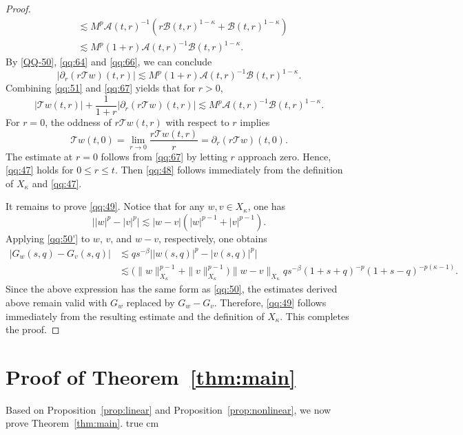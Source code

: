 \documentclass[11pt,twoside]{article}
\newcommand{\Acal}{\mathcal A}
\newcommand{\Bcal}{\mathcal B}
\newcommand{\Tcal}{\mathcal T}
\theoremstyle{plain}
\theoremstyle{definition}
\theoremstyle{remark}
\numberwithin{equation}{section}
\begin{document}
\begin{proof}
\begin{equation}
\begin{aligned}
&\lesssim
M^p\Acal(t,r)^{-1}
\left(
r\Bcal(t,r)^{1-\kappa}
+\Bcal(t,r)^{1-\kappa}
\right)\\
&\lesssim
M^p(1+r)
\Acal(t,r)^{-1}
\Bcal(t,r)^{1-\kappa}.
\end{aligned}
\end{equation}
By \eqref{QQ-50}, \eqref{qq:64} and
\eqref{qq:66}, we can conclude
\begin{equation}
\label{qq:67}
\left|
\partial_r(r\Tcal w)(t,r)
\right|
\lesssim
M^p(1+r)
\Acal(t,r)^{-1}
\Bcal(t,r)^{1-\kappa}.
\end{equation}
Combining \eqref{qq:51} and \eqref{qq:67} yields that for $r>0$,
\begin{equation}
\label{qq:68}
|\Tcal w(t,r)|
+\frac1{1+r}
\left|
\partial_r(r\Tcal w)(t,r)
\right|
\lesssim
M^p
\Acal(t,r)^{-1}
\Bcal(t,r)^{1-\kappa}.
\end{equation}
For $r=0$, the oddness of $r\Tcal w(t,r)$ with respect to $r$
implies
\[
\Tcal w(t,0)
=\lim_{r\to0}
\frac{r\Tcal w(t,r)}{r}
=\partial_r(r\Tcal w)(t,0).
\]
The estimate at $r=0$ follows from \eqref{qq:67} by letting
$r$ approach zero.
Hence, \eqref{qq:47} holds for $0\leq r\leq t$.
Then \eqref{qq:48} follows immediately from the definition of
$X_\kappa$ and \eqref{qq:47}.

It remains to prove \eqref{qq:49}. Notice that for any $w,v\in X_\kappa$, one has
\[
\bigl||w|^p-|v|^p\bigr|
\lesssim
|w-v|
\left(
|w|^{p-1}
+|v|^{p-1}
\right).
\]
Applying \eqref{qq:50'} to $w$, $v$, and $w-v$, respectively,
one obtains
\[
\begin{aligned}
|G_w(s,q)-G_v(s,q)|
&\lesssim
q s^{-\beta}
\bigl||w(s,q)|^p-|v(s,q)|^p\bigr|
\\
&\lesssim
\big(\|w\|_{X_\kappa}^{p-1}
+\|v\|_{X_\kappa}^{p-1}
\big)
\|w-v\|_{X_\kappa}
q s^{-\beta}
(1+s+q)^{-p}
(1+s-q)^{-p(\kappa-1)}.
\end{aligned}
\]
Since the above expression has the same form as \eqref{qq:50},
the estimates derived above remain valid with $G_w$ replaced by
$G_w-G_v$.
Therefore, \eqref{qq:49}  follows immediately from the resulting
estimate and the definition of $X_\kappa$. This completes the proof.
\end{proof}
\section{Proof of Theorem~\ref{thm:main}}\label{Sect5}

Based on Proposition~\ref{prop:linear} and
Proposition~\ref{prop:nonlinear}, we now prove Theorem~\ref{thm:main}.
 true cm
\end{document}

